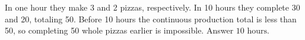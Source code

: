 In one hour they make 3 and 2 pizzas, respectively. In 10 hours they complete 30 and 20, totaling 50. Before 10 hours the continuous production total is less than 50, so completing 50 whole pizzas earlier is impossible. Answer $\boxed{10\text{ hours}}$.
